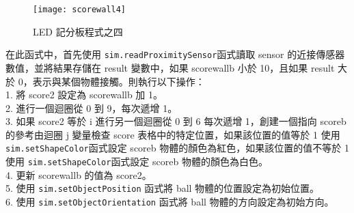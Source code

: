 \begin{figure}[hbt!]
\begin{center}
\texttt{[image: scorewall4]}
\caption{\Large LED 記分板程式之四}\label{LED 記分板程式之四}
\end{center}
\end{figure} 
在此函式中，首先使用 \texttt{sim.readProximitySensor}函式讀取 sensor 的近接傳感器數值，並將結果存儲在 result 變數中，如果 scorewallb 小於 10，且如果 result 大於 0，表示與某個物體接觸。則執行以下操作：\\
1. 將 score2 設定為 scorewallb 加 1。\\
2. 進行一個迴圈從 0 到 9，每次遞增 1。\\
3. 如果 score2 等於 i 進行另一個迴圈從 0 到 6 每次遞增 1，創建一個指向 scoreb 的參考由迴圈 j 變量檢查 score 表格中的特定位置，如果該位置的值等於 1 使用 \texttt{sim.setShapeColor}函式設定 scoreb 物體的顏色為紅色，如果該位置的值不等於 1 使用 \texttt{sim.setShapeColor}函式設定 scoreb 物體的顏色為白色。\\
4. 更新 scorewallb 的值為 score2。\\
5. 使用 \texttt{sim.setObjectPosition} 函式將 ball 物體的位置設定為初始位置。\\
6. 使用 \texttt{sim.setObjectOrientation} 函式將 ball 物體的方向設定為初始方向。\\
\newpage

